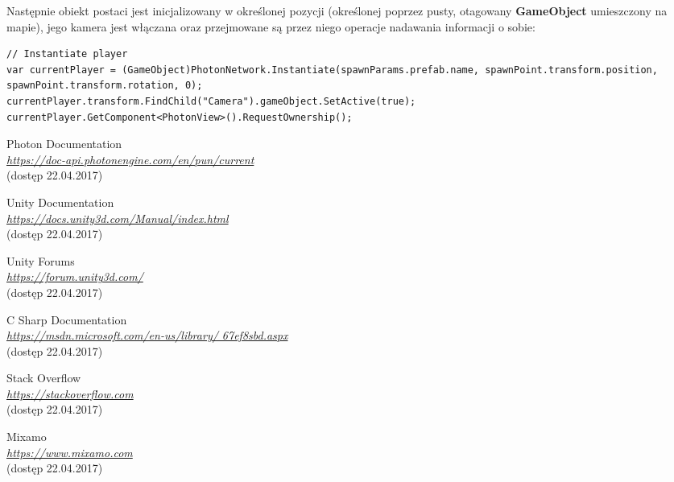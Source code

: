 \documentclass[openright]{xmgr}
\newcommand{\name}[1]{\textbf{\textcolor{NavyBlue}{#1}}}
\begin{document}
      Następnie obiekt postaci jest inicjalizowany w określonej pozycji (określonej poprzez pusty, otagowany \name{GameObject} umieszczony na mapie), jego kamera jest włączana oraz przejmowane są przez niego operacje nadawania informacji o sobie:

\begin{minipage}{\textwidth}
\begin{lstlisting}[caption={Algorytm inicjalizacji postaci gracza}]
// Instantiate player
var currentPlayer = (GameObject)PhotonNetwork.Instantiate(spawnParams.prefab.name, spawnPoint.transform.position, spawnPoint.transform.rotation, 0);
currentPlayer.transform.FindChild("Camera").gameObject.SetActive(true);
currentPlayer.GetComponent<PhotonView>().RequestOwnership();
\end{lstlisting}
\end{minipage}








\begin{thebibliography}{9}
Photon Documentation\\
\textit{\url{https://doc-api.photonengine.com/en/pun/current}}\\
(dostęp 22.04.2017)

Unity Documentation\\
\textit{\url{https://docs.unity3d.com/Manual/index.html}}\\
(dostęp 22.04.2017)

Unity Forums\\
\textit{\url{https://forum.unity3d.com/}}\\
(dostęp 22.04.2017)

C Sharp Documentation\\
\textit{\url{https://msdn.microsoft.com/en-us/library/
67ef8sbd.aspx}}\\
(dostęp 22.04.2017)

Stack Overflow\\
\textit{\url{https://stackoverflow.com}}\\
(dostęp 22.04.2017)

Mixamo\\
\textit{\url{https://www.mixamo.com}}\\
(dostęp 22.04.2017)
\end{thebibliography}


\oswiadczenie
\end{document}
